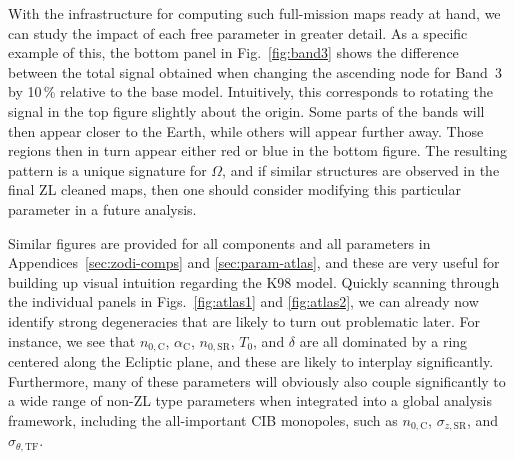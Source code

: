 \documentclass[twocolumn]{aa}
\begin{document}
With the infrastructure for computing such full-mission maps ready at
hand, we can study the impact of each free parameter in greater
detail. As a specific example of this, the bottom panel in
Fig.~\ref{fig:band3} shows the difference between the total signal
obtained when changing the ascending node for Band~3 by 10\,\%
relative to the base model. Intuitively, this corresponds to rotating
the signal in the top figure slightly about the origin. Some parts of
the bands will then appear closer to the Earth, while others will
appear further away. Those regions then in turn appear either red or
blue in the bottom figure. The resulting pattern is a unique
signature for $\Omega$, and if similar structures are observed in the
final ZL cleaned maps, then one should consider modifying this
particular parameter in a future analysis.

Similar figures are provided for all components and all parameters in
Appendices~\ref{sec:zodi-comps} and \ref{sec:param-atlas}, and these
are very useful for building up visual intuition regarding the K98
model. Quickly scanning through the individual panels in
Figs.~\ref{fig:atlas1} and \ref{fig:atlas2}, we can already now
identify strong degeneracies that are likely to turn out problematic
later. For instance, we see that $n_{0,\mathrm{C}}$,
$\alpha_\mathrm{C}$, $n_{0,\mathrm{SR}}$, $T_0$, and $\delta$ are all
dominated by a ring centered along the Ecliptic plane, and these are
likely to interplay significantly. Furthermore, many of these
parameters will obviously also couple significantly to a wide range of
non-ZL type parameters when integrated into a global analysis
framework, including the all-important CIB monopoles, such as
$n_{0,\mathrm{C}}$, $\sigma_{z,\mathrm{SR}}$, and
$\sigma_{\theta,\mathrm{TF}}$.
\end{document}
